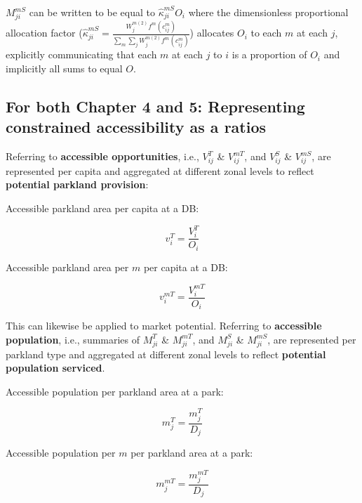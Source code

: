 \documentclass[
11pt, %
oneside, %
english, %
singlespacing, %
]{macthesis} %
\begin{document}
\(M_{ji}^{mS}\) can be written to be equal to \(\hat \kappa_{ji}^{mS} O_i\) where the dimensionless proportional allocation factor (\(\hat \kappa_{ji}^{mS} =  \frac{W_j^{m(2)} f^m(c^m_{ij})}{\sum_m\sum_j W_j^{m(2)} f^m(c^m_{ij})}\)) allocates \(O_i\) to each \(m\) at each \(j\), explicitly communicating that each \(m\) at each \(j\) to \(i\) is a proportion of \(O_i\) and implicitly all sums to equal \(O\).

\subsection{For both Chapter 4 and 5: Representing constrained accessibility as a ratios}\label{for-both-chapter-4-and-5-representing-constrained-accessibility-as-a-ratios}

Referring to \textbf{accessible opportunities}, i.e., \(V_{ij}^T\) \& \(V_{ij}^{mT}\), and \(V_{ij}^{S}\) \& \(V_{ij}^{mS}\), are represented per capita and aggregated at different zonal levels to reflect \textbf{potential parkland provision}:

Accessible parkland area per capita at a DB:

\begin{equation}
\label{eq:total-constrained-access-per-capita}
v^{T}_{i} = \frac{V^{T}_{i}}{O_{i}}
\end{equation} 

Accessible parkland area per \(m\) per capita at a DB:

\begin{equation}
\label{eq:total-constrained-multimodal-access-per-capita}
v^{mT}_{i} = \frac{V^{mT}_{i}}{O_{i}}
\end{equation} 

This can likewise be applied to market potential. Referring to \textbf{accessible population}, i.e., summaries of \(M_{ji}^T\) \& \(M_{ji}^{mT}\), and \(M_{ji}^{S}\) \& \(M_{ji}^{mS}\), are represented per parkland type and aggregated at different zonal levels to reflect \textbf{potential population serviced}.

Accessible population per parkland area at a park:

\begin{equation}
\label{eq:total-constrained-market-per-capita}
m^{T}_{j} = \frac{m^{T}_{j}}{D_{j}}
\end{equation} 

Accessible population per \(m\) per parkland area at a park:

\begin{equation}
\label{eq:total-constrained-multimodal-market-per-capita}
m^{mT}_{j} = \frac{m^{mT}_{j}}{D_{j}}
\end{equation} 
\end{document}
